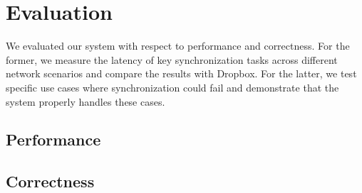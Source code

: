 \section{Evaluation}
\label{evaluation}
We evaluated our system with respect to performance and correctness.
For the former, we measure the latency of key synchronization tasks
across different network scenarios and compare the results
with Dropbox. For the latter, we test specific use cases
where synchronization could fail and demonstrate that the system
properly handles these cases.

\subsection{Performance}
\label{evaluation.performance}

\subsection{Correctness}
\label{evaluation.correctness}
